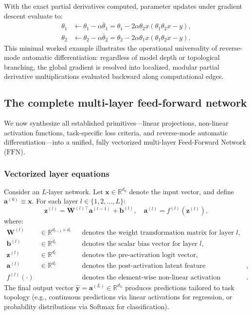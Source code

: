 \documentclass[../../../main.tex]{subfiles}
\begin{document}
With the exact partial derivatives computed, parameter updates under gradient descent evaluate to:
\begin{align}
\theta_1 &\leftarrow \theta_1 - \alpha \bar{\theta}_1 = \theta_1 - 2\alpha \theta_2 x \left( \theta_1 \theta_2 x - y \right), \\
\theta_2 &\leftarrow \theta_2 - \alpha \bar{\theta}_2 = \theta_2 - 2\alpha \theta_1 x \left( \theta_1 \theta_2 x - y \right).
\end{align}
This minimal worked example illustrates the operational universality of reverse-mode automatic differentiation: regardless of model depth or topological branching, the global gradient is resolved into localized, modular partial derivative multiplications evaluated backward along computational edges.

\subsection{The complete multi-layer feed-forward network}
\label{subsec:complete_ffn_ensemble}

We now synthesize all established primitives—linear projections, non-linear activation functions, task-specific loss criteria, and reverse-mode automatic differentiation—into a unified, fully vectorized multi-layer Feed-Forward Network ($\text{FFN}$).

\subsubsection{Vectorized layer equations}

Consider an $L$-layer network. Let $\mathbf{x} \in \mathbb{R}^{d_0}$ denote the input vector, and define $\mathbf{a}^{(0)} \equiv \mathbf{x}$. For each layer $l \in \{1, 2, \dots, L\}$:
\begin{equation}
\mathbf{z}^{(l)} = \mathbf{W}^{(l)\top} \mathbf{a}^{(l-1)} + \mathbf{b}^{(l)}, \quad \mathbf{a}^{(l)} = f^{(l)}\left(\mathbf{z}^{(l)}\right),
\label{eq:ffn_layer_forward}
\end{equation}
where:
\begin{align}
\mathbf{W}^{(l)} &\in \mathbb{R}^{d_{l-1} \times d_l} && \text{denotes the weight transformation matrix for layer } l, \\
\mathbf{b}^{(l)} &\in \mathbb{R}^{d_l} && \text{denotes the scalar bias vector for layer } l, \\
\mathbf{z}^{(l)} &\in \mathbb{R}^{d_l} && \text{denotes the pre-activation logit vector}, \\
\mathbf{a}^{(l)} &\in \mathbb{R}^{d_l} && \text{denotes the post-activation latent feature representation}, \\
f^{(l)}(\cdot) & && \text{denotes the element-wise non-linear activation function}.
\end{align}
The final output vector $\hat{\mathbf{y}} = \mathbf{a}^{(L)} \in \mathbb{R}^{d_L}$ produces predictions tailored to task topology (e.g., continuous predictions via linear activations for regression, or probability distributions via Softmax for classification).
\end{document}
